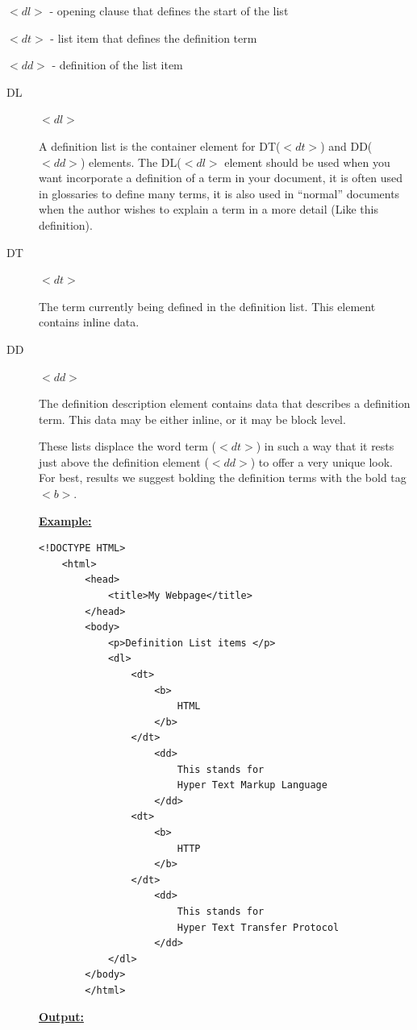 \documentclass[11pt,a4paper]{article}
\begin{document}
\begin{description}
$<dl>$ - opening clause that defines the start of the list\

$<dt>$ - list item that defines the definition term\

$<dd>$ - definition of the list item\
\begin{description}
\item[DL] $<dl>$\

A definition list is the container element for DT($<dt>$) and DD($<dd>$) elements. The DL($<dl>$ element should be used when you want incorporate a definition of a term in your document, it is often used in glossaries to define many terms, it is also used in “normal” documents when the author wishes to explain a term in a more detail (Like this definition).\

\item[DT] $<dt>$\

The term currently being defined in the definition list. This element contains inline data.\

\item[DD] $<dd>$\

The definition description element contains data that describes a definition term. This data may be either inline, or it may be block level.\

These lists displace the word term ($<dt>$) in such a way that it rests just above the definition element ($<dd>$) to offer a very unique look. For best, results we suggest bolding the definition terms with the bold tag $<b>$.

\underline{\textbf{Example:}}
\begin{verbatim}
<!DOCTYPE HTML>
    <html>
        <head>
            <title>My Webpage</title>
        </head>
        <body>
            <p>Definition List items </p>
            <dl>
                <dt>
                    <b>
                        HTML
                    </b>
                </dt>
                    <dd>
                        This stands for
                        Hyper Text Markup Language
                    </dd>
                <dt>
                    <b>
                        HTTP
                    </b>
                </dt>
                    <dd>
                        This stands for
                        Hyper Text Transfer Protocol
                    </dd>
            </dl>
        </body>      
        </html>
\end{verbatim}

\underline{\textbf{Output:}}\


\end{description}
\end{description}
\end{document}
